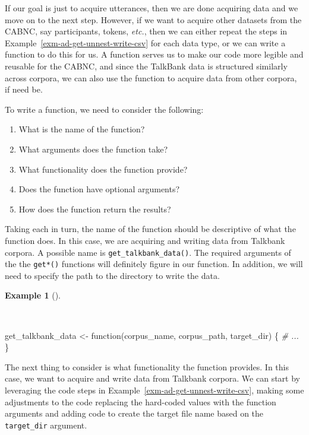 \documentclass[
  letterpaper,
  DIV=11,
  numbers=noendperiod]{scrreport}
\newenvironment{Shaded}{\begin{snugshade}}{\end{snugshade}}
\newcommand{\CommentTok}[1]{\textcolor[rgb]{0.00,0.00,0.00}{\textit{#1}}}
\newcommand{\ControlFlowTok}[1]{\textcolor[rgb]{0.00,0.00,0.00}{#1}}
\newcommand{\NormalTok}[1]{\textcolor[rgb]{0.00,0.00,0.00}{#1}}
\newcommand{\OtherTok}[1]{\textcolor[rgb]{0.00,0.00,0.00}{#1}}
\providecommand{\tightlist}{%
  \setlength{\itemsep}{0pt}\setlength{\parskip}{0pt}}\usepackage{longtable,booktabs,array}
\theoremstyle{definition}
\newtheorem{example}{Example}[chapter]
\theoremstyle{remark}
\begin{document}
If our goal is just to acquire utterances, then we are done acquiring
data and we move on to the next step. However, if we want to acquire
other datasets from the CABNC, say participants, tokens, \emph{etc.},
then we can either repeat the steps in
Example~\ref{exm-ad-get-unnest-write-csv} for each data type, or we can
write a function to do this for us. A function serves us to make our
code more legible and reusable for the CABNC, and since the TalkBank
data is structured similarly across corpora, we can also use the
function to acquire data from other corpora, if need be.

To write a function, we need to consider the following:

\begin{enumerate}
\def\labelenumi{\arabic{enumi}.}
\tightlist
\item
  What is the name of the function?
\item
  What arguments does the function take?
\item
  What functionality does the function provide?
\item
  Does the function have optional arguments?
\item
  How does the function return the results?
\end{enumerate}

Taking each in turn, the name of the function should be descriptive of
what the function does. In this case, we are acquiring and writing data
from Talkbank corpora. A possible name is
\texttt{get\_talkbank\_data()}. The required arguments of the the
\texttt{get*()} functions will definitely figure in our function. In
addition, we will need to specify the path to the directory to write the
data.

\begin{example}[]\protect\hypertarget{exm-ad-get-talkbank-data-1}{}\label{exm-ad-get-talkbank-data-1}

~

\begin{Shaded}
\begin{Highlighting}[]
\NormalTok{get\_talkbank\_data }\OtherTok{\textless{}{-}} \ControlFlowTok{function}\NormalTok{(corpus\_name, corpus\_path, target\_dir) \{}
  \CommentTok{\# ...}
\NormalTok{\}}
\end{Highlighting}
\end{Shaded}

\end{example}

The next thing to consider is what functionality the function provides.
In this case, we want to acquire and write data from Talkbank corpora.
We can start by leveraging the code steps in
Example~\ref{exm-ad-get-unnest-write-csv}, making some adjustments to
the code replacing the hard-coded values with the function arguments and
adding code to create the target file name based on the
\texttt{target\_dir} argument.
\end{document}
